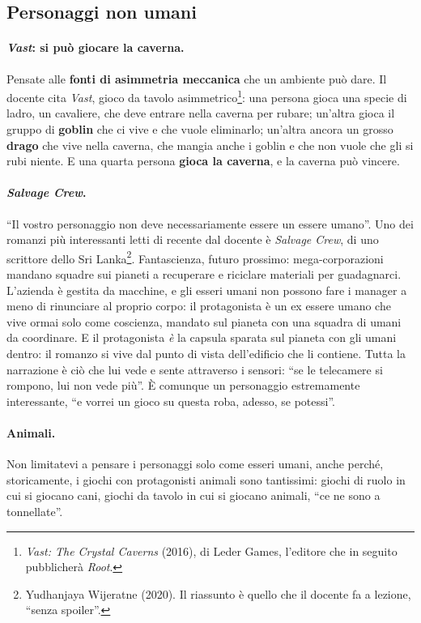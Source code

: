 \subsection{Personaggi non umani}

\paragraph{\emph{Vast}: si può giocare la caverna.} Pensate alle \textbf{fonti di
asimmetria meccanica} che un ambiente può dare. Il docente cita \emph{Vast}, gioco
da tavolo asimmetrico\footnote{\emph{Vast: The Crystal Caverns} (2016), di Leder
Games, l'editore che in seguito pubblicherà \emph{Root}.}: una persona gioca una
specie di ladro, un cavaliere, che deve entrare nella caverna per rubare; un'altra
gioca il gruppo di \textbf{goblin} che ci vive e che vuole eliminarlo; un'altra
ancora un grosso \textbf{drago} che vive nella caverna, che mangia anche i goblin e
che non vuole che gli si rubi niente. E una quarta persona \textbf{gioca la caverna},
e la caverna può vincere.

\paragraph{\emph{Salvage Crew}.} ``Il vostro personaggio non deve necessariamente
essere un essere umano''. Uno dei romanzi più interessanti letti di recente dal
docente è \emph{Salvage Crew}, di uno scrittore dello Sri Lanka\footnote{Yudhanjaya
Wijeratne (2020). Il riassunto è quello che il docente fa a lezione, ``senza
spoiler''.}. Fantascienza, futuro prossimo: mega-corporazioni mandano squadre sui
pianeti a recuperare e riciclare materiali per guadagnarci. L'azienda è gestita da
macchine, e gli esseri umani non possono fare i manager a meno di rinunciare al
proprio corpo: il protagonista è un ex essere umano che vive ormai solo come
coscienza, mandato sul pianeta con una squadra di umani da coordinare. E il
protagonista \emph{è} la capsula sparata sul pianeta con gli umani dentro: il
romanzo si vive dal punto di vista dell'edificio che li contiene. Tutta la
narrazione è ciò che lui vede e sente attraverso i sensori: ``se le telecamere si
rompono, lui non vede più''. È comunque un personaggio estremamente interessante,
``e vorrei un gioco su questa roba, adesso, se potessi''.

\paragraph{Animali.} Non limitatevi a pensare i personaggi solo come esseri umani,
anche perché, storicamente, i giochi con protagonisti animali sono tantissimi:
giochi di ruolo in cui si giocano cani, giochi da tavolo in cui si giocano animali,
``ce ne sono a tonnellate''.

